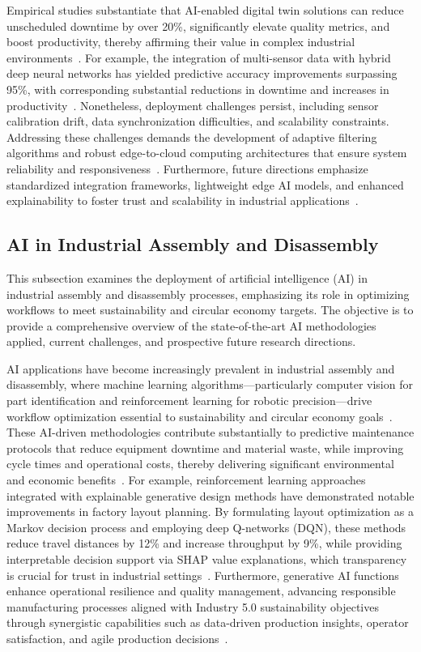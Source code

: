 \documentclass[sigconf]{acmart}
\begin{document}
Empirical studies substantiate that AI-enabled digital twin solutions can reduce unscheduled downtime by over 20\%, significantly elevate quality metrics, and boost productivity, thereby affirming their value in complex industrial environments~\cite{ref31,ref36}. For example, the integration of multi-sensor data with hybrid deep neural networks has yielded predictive accuracy improvements surpassing 95\%, with corresponding substantial reductions in downtime and increases in productivity~\cite{ref45}. Nonetheless, deployment challenges persist, including sensor calibration drift, data synchronization difficulties, and scalability constraints. Addressing these challenges demands the development of adaptive filtering algorithms and robust edge-to-cloud computing architectures that ensure system reliability and responsiveness~\cite{ref34}. Furthermore, future directions emphasize standardized integration frameworks, lightweight edge AI models, and enhanced explainability to foster trust and scalability in industrial applications~\cite{ref33,ref38}.

\subsection{AI in Industrial Assembly and Disassembly}

This subsection examines the deployment of artificial intelligence (AI) in industrial assembly and disassembly processes, emphasizing its role in optimizing workflows to meet sustainability and circular economy targets. The objective is to provide a comprehensive overview of the state-of-the-art AI methodologies applied, current challenges, and prospective future research directions.

AI applications have become increasingly prevalent in industrial assembly and disassembly, where machine learning algorithms—particularly computer vision for part identification and reinforcement learning for robotic precision—drive workflow optimization essential to sustainability and circular economy goals~\cite{ref6,ref9,ref44}. These AI-driven methodologies contribute substantially to predictive maintenance protocols that reduce equipment downtime and material waste, while improving cycle times and operational costs, thereby delivering significant environmental and economic benefits~\cite{ref7,ref13}. For example, reinforcement learning approaches integrated with explainable generative design methods have demonstrated notable improvements in factory layout planning. By formulating layout optimization as a Markov decision process and employing deep Q-networks (DQN), these methods reduce travel distances by 12\% and increase throughput by 9\%, while providing interpretable decision support via SHAP value explanations, which transparency is crucial for trust in industrial settings~\cite{ref9}. Furthermore, generative AI functions enhance operational resilience and quality management, advancing responsible manufacturing processes aligned with Industry 5.0 sustainability objectives through synergistic capabilities such as data-driven production insights, operator satisfaction, and agile production decisions~\cite{ref6}.
\end{document}
